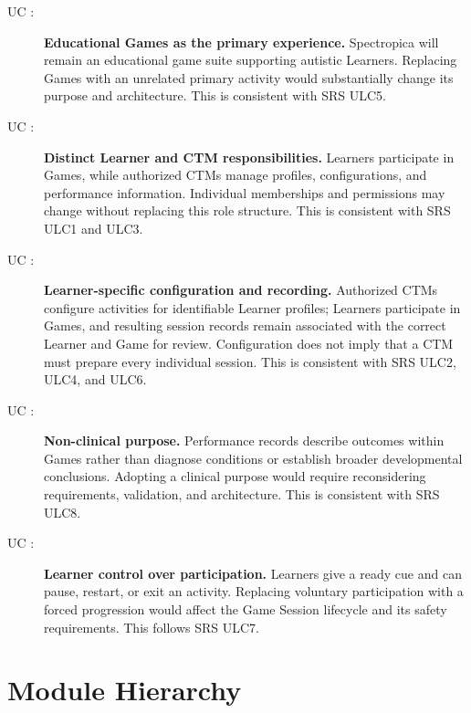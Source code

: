 \documentclass[12pt, titlepage]{article}
\newcounter{ucnum}
\newcommand{\uctheucnum}{UC\theucnum}
\begin{document}
\begin{description}

\item[ \uctheucnum
\label{ucPurpose}:]
\textbf{Educational Games as the primary experience.}
Spectropica will remain an educational game suite supporting autistic
Learners. Replacing Games with an unrelated primary activity would
substantially change its purpose and architecture. This is consistent
with SRS ULC5.

\item[ \uctheucnum
\label{ucUserRoles}:]
\textbf{Distinct Learner and CTM responsibilities.}
Learners participate in Games, while authorized CTMs manage profiles,
configurations, and performance information. Individual memberships
and permissions may change without replacing this role structure.
This is consistent with SRS ULC1 and ULC3.

\item[ \uctheucnum
\label{ucCoreWorkflow}:]
\textbf{Learner-specific configuration and recording.}
Authorized CTMs configure activities for identifiable Learner profiles;
Learners participate in Games, and resulting session records remain
associated with the correct Learner and Game for review. Configuration
does not imply that a CTM must prepare every individual session.
This is consistent with SRS ULC2, ULC4, and ULC6.

\item[ \uctheucnum
\label{ucNonClinical}:]
\textbf{Non-clinical purpose.}
Performance records describe outcomes within Games rather than diagnose
conditions or establish broader developmental conclusions. Adopting a
clinical purpose would require reconsidering requirements, validation,
and architecture. This is consistent with SRS ULC8.

\item[ \uctheucnum
\label{ucLearnerControl}:]
\textbf{Learner control over participation.}
Learners give a ready cue and can pause, restart, or exit an activity.
Replacing voluntary participation with a forced progression would affect
the Game Session lifecycle and its safety requirements. This follows SRS ULC7.

\end{description}

\section{Module Hierarchy} \label{SecMH}
\end{document}
